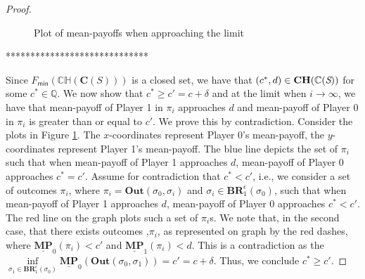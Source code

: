 \begin{proof}
\begin{figure}
    \centering
    \caption{Plot of mean-payoffs when approaching the limit}
    \label{fig:plot_mp_limit}
\end{figure}

*****************************

Since $F_{\mathsf{min}}(\mathbb{CH}(\mathbf{C}(S)))$ is a closed set, we have that $(c^*, d) \in \mathbf{CH(\mathbb{C}(\emph{S}))}$ for some $c^* \in \mathbb{Q}$. We now show that $c^* \geqslant c' = c+\delta$ and at the limit when $i\to \infty$, we have that mean-payoff of Player 1 in $\pi_i$ approaches $d$ and mean-payoff of Player 0 in $\pi_i$ is greater than or equal to $c'$. We prove this by contradiction. Consider the plots in Figure \ref{fig:plot_mp_limit}. The $x$-coordinates represent Player 0's mean-payoff, the $y$-coordinates represent Player 1's mean-payoff. The blue line depicts the set of $\pi_i$ such that when mean-payoff of Player 1 approaches $d$, mean-payoff of Player 0 approaches $c^* = c'$. Assume for contradiction that $c^* < c'$, i.e., we consider a set of outcomes $\pi_i$, where $\pi_i=\mathbf{Out}(\sigma_0, \sigma_i)$ and $\sigma_i \in \mathbf{BR}_1^{\epsilon}(\sigma_0)$, such that when mean-payoff of Player 1 approaches $d$, mean-payoff of Player 0 approaches $c^* < c'$. The red line on the graph plots such a set of $\pi_i$s. We note that, in the second case, that there exists outcomes ,$\pi_i$, as represented on graph by the red dashes, where $\underline{\mathbf{MP}}_0(\pi_i) < c'$ and $\underline{\mathbf{MP}}_1(\pi_i) < d$. This is a contradiction as the $\inf\limits_{\sigma_1 \in \mathbf{BR}_1^{\epsilon}(\sigma_0)} \underline{\mathbf{MP}}_0(\mathbf{Out}(\sigma_0, \sigma_1)) = c' = c + \delta$. Thus, we conclude $c^* \geqslant c'$. 


\end{proof}
